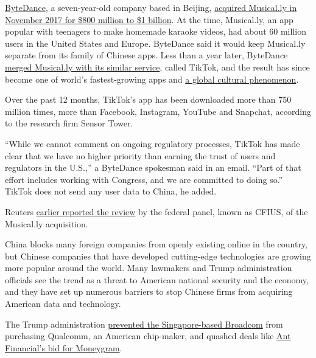 \href{https://www.nytimes3xbfgragh.onion/2018/10/29/technology/bytedance-app-funding-china.html}{ByteDance},
a seven-year-old company based in Beijing,
\href{https://www.nytimes3xbfgragh.onion/2017/11/10/business/dealbook/musically-sold-app-video.html}{acquired
Musical.ly in November 2017 for \$800 million to \$1 billion}. At the
time, Musical.ly, an app popular with teenagers to make homemade karaoke
videos, had about 60 million users in the United States and Europe.
ByteDance said it would keep Musical.ly separate from its family of
Chinese apps. Less than a year later, ByteDance
\href{https://www.theverge.com/2018/8/2/17644260/musically-rebrand-tiktok-bytedance-douyin}{merged
Musical.ly with its similar service}, called TikTok, and the result has
since become one of world's fastest-growing apps and
\href{https://www.nytimes3xbfgragh.onion/interactive/2019/10/10/arts/TIK-TOK.html}{a
global cultural phenomenon}.

Over the past 12 months, TikTok's app has been downloaded more than 750
million times, more than Facebook, Instagram, YouTube and Snapchat,
according to the research firm Sensor Tower.

``While we cannot comment on ongoing regulatory processes, TikTok has
made clear that we have no higher priority than earning the trust of
users and regulators in the U.S.,'' a ByteDance spokesman said in an
email. ``Part of that effort includes working with Congress, and we are
committed to doing so.'' TikTok does not send any user data to China, he
added.

Reuters
\href{https://www.reuters.com/article/us-tiktok-cfius-exclusive/exclusive-u-s-opens-national-security-investigation-into-tiktok-sources-idUSKBN1XB4IL}{earlier
reported the review} by the federal panel, known as CFIUS, of the
Musical.ly acquisition.

China blocks many foreign companies from openly existing online in the
country, but Chinese companies that have developed cutting-edge
technologies are growing more popular around the world. Many lawmakers
and Trump administration officials see the trend as a threat to American
national security and the economy, and they have set up numerous
barriers to stop Chinese firms from acquiring American data and
technology.

The Trump administration
\href{https://www.nytimes3xbfgragh.onion/2018/03/12/technology/trump-broadcom-qualcomm-merger.html}{prevented
the Singapore-based Broadcom} from purchasing Qualcomm, an American
chip-maker, and quashed deals like
\href{https://www.nytimes3xbfgragh.onion/2018/01/02/business/moneygram-ant-financial-china-cfius.html}{Ant
Financial's bid for Moneygram}.

